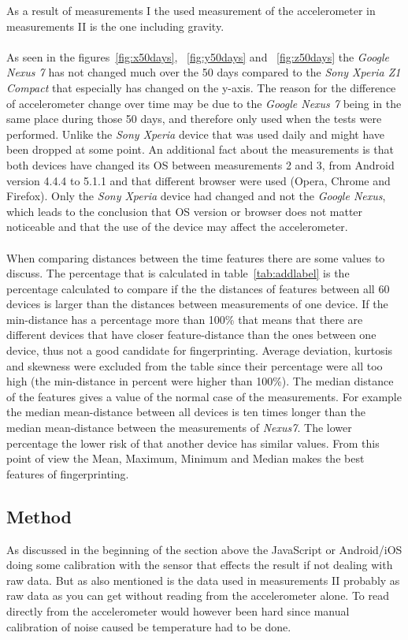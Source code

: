 As a result of measurements I the used measurement of the accelerometer in measurements II is the one including gravity. \\
\\
As seen in the figures~\ref{fig:x50days}, ~\ref{fig:y50days} and ~\ref{fig:z50days} the \textit{Google Nexus 7} has not changed much over the 50 days compared to the \textit{Sony Xperia Z1 Compact} that especially has changed on the y-axis. The reason for the difference of accelerometer change over time may be due to the \textit{Google Nexus 7} being in the same place during those 50 days, and therefore only used when the tests were performed. Unlike the \textit{Sony Xperia} device that was used daily and might have been dropped at some point. An additional fact about the measurements is that both devices have changed its OS between measurements 2 and 3, from Android version 4.4.4 to 5.1.1 and that different browser were used (Opera, Chrome and Firefox). Only the \textit{Sony Xperia} device had changed and not the \textit{Google Nexus}, which leads to the conclusion that OS version or browser does not matter noticeable and that the use of the device may affect the accelerometer.\\
\\
When comparing distances between the time features there are some values to discuss. The percentage that is calculated in table~\ref{tab:addlabel} is the percentage calculated to compare if the the distances of features between all 60 devices is larger than the distances between measurements of one device. If the min-distance has a percentage more than 100\% that means that there are different devices that have closer feature-distance than the ones between one device, thus not a good candidate for fingerprinting. Average deviation, kurtosis and skewness were excluded from the table since their percentage were all too high (the min-distance in percent were higher than 100\%). The median distance of the features gives a value of the normal case of the measurements. For example the median mean-distance between all devices is ten times longer than the median mean-distance between the measurements of \textit{Nexus7}. The lower percentage the lower risk of that another device has similar values. From this point of view the Mean, Maximum, Minimum and Median makes the best features of fingerprinting.

\subsection{Method}
As discussed in the beginning of the section above the JavaScript or Android/iOS doing some calibration with the sensor that effects the result if not dealing with raw data. But as also mentioned is the data used in measurements II probably as raw data as you can get without reading from the accelerometer alone. To read directly from the accelerometer would however been hard since manual calibration of noise caused be temperature had to be done.

